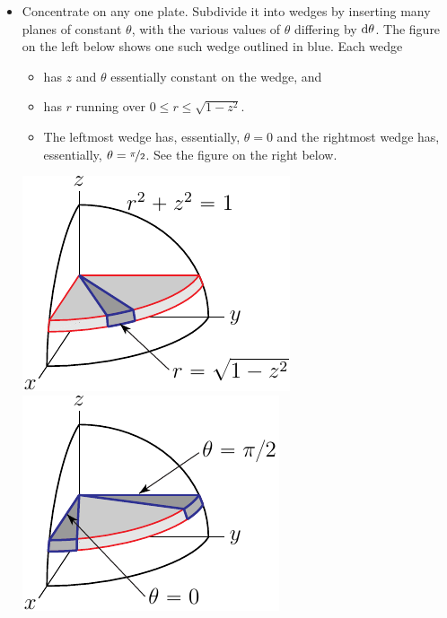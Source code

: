 \begin{eg}
\begin{itemize}
\item 
Concentrate on any one plate. Subdivide it into wedges
by inserting many planes of constant $\theta$, with the various 
values of $\theta$ differing by $\mathrm{d}\theta$. The figure on the 
left below shows one such wedge outlined in blue. Each wedge
\vspace{-\topsep}
\begin{itemize} \itemsep1pt \parskip0pt 
\item
has $z$  and $\theta$ essentially constant on the wedge, and 
\item
has $r$ running over $0\le r\le \sqrt{1-z^2}$.
\item The leftmost wedge has, essentially, $\theta=0$ and the rightmost 
wedge has, essentially, $\theta=\nicefrac{\pi}{2}$.  See the figure 
on the right below.
\end{itemize}
\vspace{-\topsep}
\begin{efig}
\begin{center}
    \includegraphics{sphereCyl2a.pdf}\quad
    \includegraphics{sphereCyl2b.pdf}
\end{center}
\end{efig}


\end{itemize}
\end{eg}
